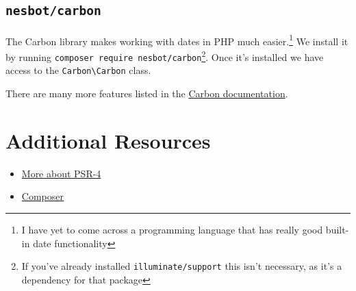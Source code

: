 


\subsection{\texttt{nesbot/carbon}}

The Carbon library makes working with dates in PHP much easier.\footnote{I have yet to come across a programming language that has really good built-in date functionality} We install it by running \texttt{composer require nesbot/carbon}\footnote{If you've already installed \texttt{illuminate/support} this isn't necessary, as it's a dependency for that package}. Once it's installed we have access to the \texttt{Carbon\textbackslash Carbon} class.


There are many more features listed in the \href{https://carbon.nesbot.com/docs/}{Carbon documentation}.

\section{Additional Resources}

\begin{itemize}[leftmargin=*]
    \item \href{https://www.php-fig.org/psr/psr-4/meta/}{More about PSR-4}
    \item \href{https://getcomposer.org}{Composer}
\end{itemize}
